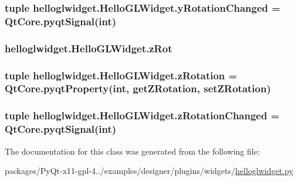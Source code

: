 \subsubsection[{y\+Rotation\+Changed}]{\setlength{\rightskip}{0pt plus 5cm}tuple helloglwidget.\+Hello\+G\+L\+Widget.\+y\+Rotation\+Changed = Qt\+Core.\+pyqt\+Signal(int)\hspace{0.3cm}{\ttfamily [static]}}\label{classhelloglwidget_1_1HelloGLWidget_a131818acdbe34951eb840f8081dd63a3}
\hypertarget{classhelloglwidget_1_1HelloGLWidget_a3e3867bbb0a1d6d41e0e57e444192ba7}{}
\subsubsection[{z\+Rot}]{\setlength{\rightskip}{0pt plus 5cm}helloglwidget.\+Hello\+G\+L\+Widget.\+z\+Rot}\label{classhelloglwidget_1_1HelloGLWidget_a3e3867bbb0a1d6d41e0e57e444192ba7}
\hypertarget{classhelloglwidget_1_1HelloGLWidget_a44b7f231e5c88df368c32ff045c93950}{}
\subsubsection[{z\+Rotation}]{\setlength{\rightskip}{0pt plus 5cm}tuple helloglwidget.\+Hello\+G\+L\+Widget.\+z\+Rotation = Qt\+Core.\+pyqt\+Property(int, {\bf get\+Z\+Rotation}, {\bf set\+Z\+Rotation})\hspace{0.3cm}{\ttfamily [static]}}\label{classhelloglwidget_1_1HelloGLWidget_a44b7f231e5c88df368c32ff045c93950}
\hypertarget{classhelloglwidget_1_1HelloGLWidget_ab094ffd7a6378d90f67cf4f3502f2864}{}
\subsubsection[{z\+Rotation\+Changed}]{\setlength{\rightskip}{0pt plus 5cm}tuple helloglwidget.\+Hello\+G\+L\+Widget.\+z\+Rotation\+Changed = Qt\+Core.\+pyqt\+Signal(int)\hspace{0.3cm}{\ttfamily [static]}}\label{classhelloglwidget_1_1HelloGLWidget_ab094ffd7a6378d90f67cf4f3502f2864}


The documentation for this class was generated from the following file\+:\begin{DoxyCompactItemize}
\item 
packages/\+Py\+Qt-\/x11-\/gpl-\/4../examples/designer/plugins/widgets/\hyperlink{helloglwidget_8py}{helloglwidget.\+py}\end{DoxyCompactItemize}
